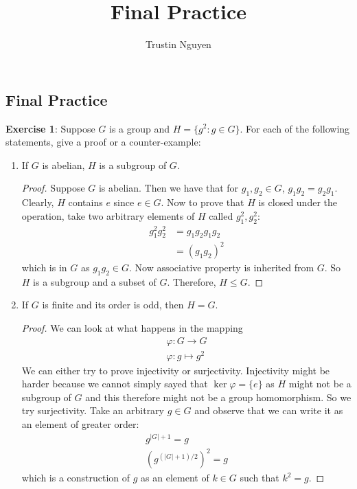 \documentclass{article}
\title{Final Practice}
\author{Trustin Nguyen}
\begin{document}
\maketitle
\reversemarginpar

\begin{topic}
	\section*{Final Practice}
\end{topic}

\textbf{Exercise 1}: Suppose $G$ is a group and $H = \{g^{2} : g \in G\}$. For each of the following statements, give a proof or a counter-example:
\begin{enumerate}
	\item If $G$ is abelian, $H$ is a subgroup of $G$.
		\begin{proof}
			Suppose $G$ is abelian. Then we have that for $g_{1}, g_{2} \in G$, $g_{1}g_{2} = g_{2}g_{1}$. Clearly, $H$ contains $e$ since $e \in G$. Now to prove that $H$ is closed under the operation, take two arbitrary elements of $H$ called $g_{1}^{2}, g_{2}^{2}$:
			\begin{align*}
				g_{1}^{2}g_{2}^{2} &= g_{1}g_{2}g_{1}g_{2} \\
						   &= (g_{1}g_{2})^{2}
			\end{align*}
			which is in $G$ as $g_{1}g_{2} \in G$. Now associative property is inherited from $G$. So $H$ is a subgroup and a subset of $G$. Therefore, $H \leq G$.
		\end{proof}

	\item If $G$ is finite and its order is odd, then $H = G$.
        \begin{proof}
            We can look at what happens in the mapping 
            \begin{align*}
                \varphi : G \rightarrow G \\
                \varphi : g \mapsto g^{2}
            \end{align*}
            We can either try to prove injectivity or surjectivity. Injectivity might be harder because we cannot simply sayed that $\ker{\varphi} = \{e\}$ as $H$ might not be a subgroup of $G$ and this therefore might not be a group homomorphism. So we try surjectivity. Take an arbitrary $g \in G$ and observe that we can write it as an element of greater order:
            \begin{align*}
                g^{\lvert G \rvert + 1} = g\\
            (g^{(\lvert G \rvert + 1)/2})^{2} = g
            \end{align*}
            which is a construction of $g$ as an element of $k \in G$ such that $k^{2} = g$.
        \end{proof}


\end{enumerate}
\end{document}
